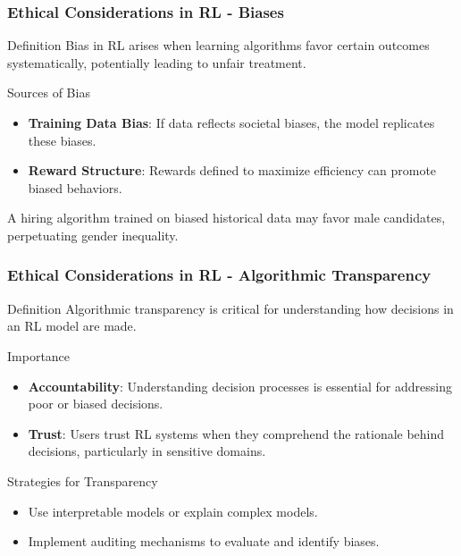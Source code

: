 \documentclass[aspectratio=169]{beamer}
\begin{document}
\begin{frame}[fragile]
    \frametitle{Ethical Considerations in RL - Biases}
    \begin{block}{Definition}
        Bias in RL arises when learning algorithms favor certain outcomes systematically, potentially leading to unfair treatment.
    \end{block}
    \begin{block}{Sources of Bias}
        \begin{itemize}
            \item \textbf{Training Data Bias}:
                If data reflects societal biases, the model replicates these biases.
            \item \textbf{Reward Structure}:
                Rewards defined to maximize efficiency can promote biased behaviors.
        \end{itemize}
    \end{block}
    \begin{example}
        A hiring algorithm trained on biased historical data may favor male candidates, perpetuating gender inequality.
    \end{example}
\end{frame}

\begin{frame}[fragile]
    \frametitle{Ethical Considerations in RL - Algorithmic Transparency}
    \begin{block}{Definition}
        Algorithmic transparency is critical for understanding how decisions in an RL model are made.
    \end{block}
    \begin{block}{Importance}
        \begin{itemize}
            \item \textbf{Accountability}: Understanding decision processes is essential for addressing poor or biased decisions.
            \item \textbf{Trust}: Users trust RL systems when they comprehend the rationale behind decisions, particularly in sensitive domains.
        \end{itemize}
    \end{block}
    \begin{block}{Strategies for Transparency}
        \begin{itemize}
            \item Use interpretable models or explain complex models.
            \item Implement auditing mechanisms to evaluate and identify biases.
        \end{itemize}
    \end{block}
\end{frame}
\end{document}
